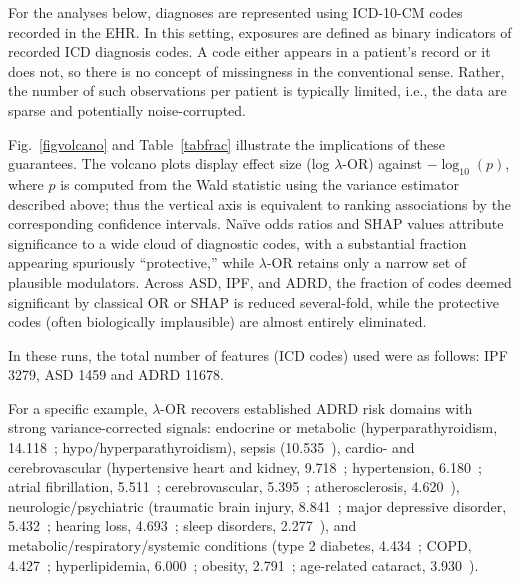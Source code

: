 \documentclass[pdflatex,sn-mathphys-num]{sn-jnl}%
\newcommand{\SPOR}{\textrm{$\lambda$-OR}}
\theoremstyle{thmstyleone}%
\theoremstyle{thmstyletwo}%
\theoremstyle{thmstylethree}%
\begin{document}
For the analyses below, diagnoses are represented using ICD-10-CM codes recorded in the EHR. In this setting, exposures are defined as binary indicators of recorded ICD diagnosis codes. A code either appears in a patient's record or it does not, so there is no concept of missingness in the conventional sense. Rather, the number of such observations per patient is typically limited, i.e., the data are sparse and potentially noise-corrupted.


Fig.~\ref{figvolcano} and Table~\ref{tabfrac} illustrate the implications of these guarantees. The volcano plots display effect size (log $\SPOR$) against $-\log_{10}(p)$, where $p$ is computed from the Wald statistic using the variance estimator described above; thus the vertical axis is equivalent to ranking associations by the corresponding confidence intervals. Naïve odds ratios and SHAP values attribute significance to a wide cloud of diagnostic codes, with a substantial fraction appearing spuriously “protective,” while $\SPOR$ retains only a narrow set of plausible modulators. Across ASD, IPF, and ADRD, the fraction of codes deemed significant by classical OR or SHAP is reduced several-fold, while the protective codes (often biologically implausible) are almost entirely eliminated.

{\color{red} In these runs, the total number of features (ICD codes) used were as follows: IPF 3279, ASD 1459 and ADRD 11678.}



 For a specific example, $\SPOR$  recovers established ADRD risk domains with strong variance-corrected signals: endocrine or metabolic (hyperparathyroidism, 14.118~\cite{HYPERPARATHYROIDISMmathur2022}; hypo/hyperparathyroidism), sepsis (10.535~\cite{SEPSISzeng2024}), cardio- and cerebrovascular (hypertensive heart and kidney, 9.718~\cite{CKDkelly2022}; hypertension, 6.180~\cite{HYPERTENSIONcarey2023}; atrial fibrillation, 5.511~\cite{ATRIALFIBRpapanastasiou2021}; cerebrovascular, 5.395~\cite{CEREBROVASCULARlove2016}; atherosclerosis, 4.620~\cite{ATHEROSCLEROSISnordestgaard2022}), neurologic/psychiatric (traumatic brain injury, 8.841~\cite{TBIgu2022}; major depressive disorder, 5.432~\cite{DEPRESSIONsaiz2021}; hearing loss, 4.693~\cite{HEARINGlitke2021}; sleep disorders, 2.277~\cite{SLEEPchoe2022}), and metabolic/respiratory/systemic conditions (type 2 diabetes, 4.434~\cite{T2DMathanasaki2022}; COPD, 4.427~\cite{COPDwang2022}; hyperlipidemia, 6.000~\cite{HYPERLIPIDEMIAezkurdia2023}; obesity, 2.791~\cite{OBESITYbeydoun2008}; age-related cataract, 3.930~\cite{CATARACTjun2012}).
\end{document}
